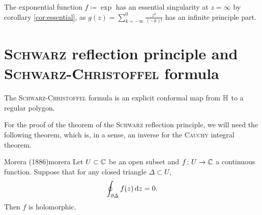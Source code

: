 \documentclass[a4paper,english]{article}
\begin{document}
\begin{example}
    The exponential function $f \coloneqq \exp$ has an essential singularity at $z = \infty$ by corollary \ref{cor:essential}, as $g(z) = \sum_{k = - \infty}^{0} \frac{z^k}{(-k)!}$ has an infinite principle part.
\end{example}

\section{\textsc{Schwarz} reflection principle and \textsc{Schwarz-Christoffel} formula}

The \textsc{Schwarz-Christoffel} formula is an explicit conformal map from $\mathbb{H}$ to a regular polygon.

For the proof of the theorem of the \textsc{Schwarz} reflection principle, we will need the following theorem, which is, in a sense, an inverse for the \textsc{Cauchy} integral theorem.
\begin{thm}{Morera (1886)}{morera}
    Let $U \subset \operatorname{\mathbb{C}}$ be an open subset and $f \colon U \to \operatorname{\mathbb{C}}$ a continuous function.
    Suppose that for any closed triangle $\Delta \subset U$,
    \begin{equation} \label{eq:morera}
        \oint_{\partial \Delta} f(z) \mathop{}\!\mathrm{d}{z}
        = 0.
    \end{equation}
    Then $f$ is holomorphic.
\end{thm}
\end{document}
